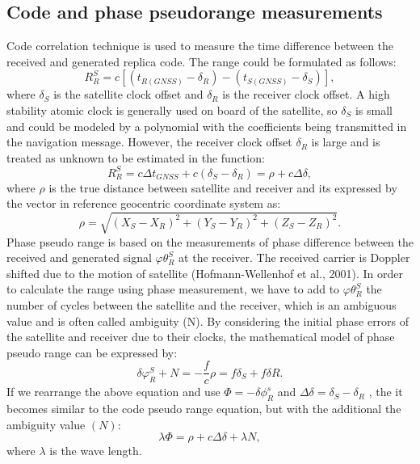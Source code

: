 \subsection{Code and phase pseudorange measurements}
Code correlation technique is used to measure the time difference between the received and
generated replica code. The range could be formulated as follows:
\begin{equation}
	\label{equ:range}
	R_{R}^{S} = c [(t_{R(GNSS)}-\delta_{R})-( t_{S(GNSS)}-\delta_{S})],
\end{equation}
where $\delta_{S}$ is the satellite clock offset  and $\delta_{R}$ is the receiver clock offset.
A high stability atomic clock is generally used on board of the satellite, so $\delta_{S}$ is 
small and could be modeled by a polynomial with the coefficients being transmitted in the 
navigation message. However, the receiver clock offset $\delta_{R}$ is large and is treated as
 unknown to be estimated in the function:
\begin{equation}
	\label{equ:reciever_error}
	R_{R}^{S} = c \Delta t_{GNSS} + c( \delta_{S} - \delta_{R}) = \rho + c  \Delta \delta,
\end{equation}
where $\rho$ is the true distance between satellite and receiver and its expressed by the vector in
reference geocentric coordinate system as:
\begin{equation}
	\label{equ:distance_geocentric}
	\rho = \sqrt{(X_{S}-X_{R})^{2}+(Y_{S}-Y_{R})^{2}+(Z_{S}-Z_{R})^{2}}.
\end{equation}
Phase pseudo range is based on the measurements of phase difference between the received and
generated signal $\varphi \theta_{R}^{S}$ at the receiver. The received carrier is
Doppler shifted due to the motion of satellite (Hofmann-Wellenhof et al., 2001).
In order to calculate the range using phase measurement, we have to add to $\varphi \theta_{R}^{S}$ 
the number of cycles between the satellite and the receiver, which is an ambiguous value and is
often called ambiguity (N). By considering the initial phase errors of the satellite and receiver
due to their clocks, the mathematical model of phase pseudo range can be expressed by:
\begin{equation}
	\label{equ:phase_pseudorange}
\delta \varphi_{R}^{S}+N = -\frac{f}{c}\rho = f\delta_{S} + f\delta{R}.
\end{equation}
If we rearrange the above equation and use $\Phi = -\delta \phi_{R}^{s}$ and 
$\Delta \delta = \delta_{S} - \delta_{R}$ , the it becomes similar to the code pseudo range
equation, but with the additional the ambiguity value $(N)$:
\begin{equation}
	\label{equ:phase_pseudorange2}
	\lambda \Phi = \rho + c \Delta \delta + \lambda  N,
\end{equation}
where $\lambda$ is the wave length.

